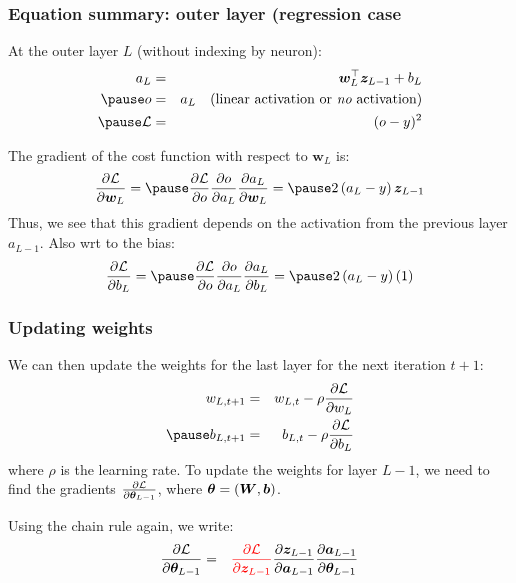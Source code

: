 \documentclass[smaller]{beamer}
\begin{document}
\begin{frame}
  \frametitle{Equation summary: outer layer (regression case}
  \pause
  At the outer layer $L$ (without indexing by neuron):\pause
  \begin{eqnarray}
    a_{L} &=& \bm w_{L}\tr \bm z_{L-1} + b_{L} \\\pause
    o &=&  a_{L}  \quad \text{(linear activation or {\it no} activation)} \\\pause
    \mc{L} &=& (o  - y)^{2}
  \end{eqnarray}
  \pause
  
  The gradient of the cost function with respect to $\bm w_{L}$ is:\pause
  \begin{equation}
    \frac{\partial \mc{L}}{\partial \bm w_{L}}
    =\pause
    \frac{\partial \mc{L}}{\partial  o}
    \frac{\partial o}{\partial a_{L}}
    \frac{\partial a_{L}}{\partial \bm w_{L}}
    =\pause
    2 \left(a_{L} - y \right) \bm z_{L-1}
  \end{equation}
  \pause
  Thus, we see that this gradient depends on the activation from the previous layer $a_{L-1}$. \pause Also wrt to the bias:
  \begin{equation}
    \pd{\mc{L}}{b_{L}} = \pause \pd{\mc{L}}{o}\pd{o}{a_{L}}\pd{a_{L}}{b_{L}} =\pause 2\lt(a_{L} - y\rt)(1)
  \end{equation}
\end{frame}

\begin{frame}
  \frametitle{Updating weights}
  \pause
  We can then update the weights for the last layer for the next iteration $t+1$:\pause
  \begin{eqnarray}
    w_{L, t+1}  &=&  w_{L,t} - \rho \pd{\mc{L}}{w_{L}}  \\\pause
    b_{L, t+1}  &=&  b_{L,t} - \rho \pd{\mc{L}}{b_{L}}  
  \end{eqnarray}
  \pause
  where $\rho$ is the learning rate. \pe To update the weights for layer $L-1$, we need to find the gradients $\frac{\partial{\mathcal{L}}}{\partial{\bm{\theta}_{L-1}}}$, where $\bm{\theta} = (\bm W, \bm b)$. %

  \pause

  \medskip
  
  Using the chain rule again, we write:\pause
  \begin{eqnarray}
    \frac{\partial{\mathcal{L}}}{\partial{\bm{\theta}_{L-1}}} &=& {\color{red} \frac{\partial{\mathcal{L}}}{\partial{\bm z_{L-1}}}}\frac{\partial{\bm z_{L-1}}}{\partial{\bm a_{L-1}}}\frac{\partial{\bm a_{L-1}}}{\partial{\bm{\theta}_{L-1}}}
  \end{eqnarray}
\end{frame}
\end{document}
